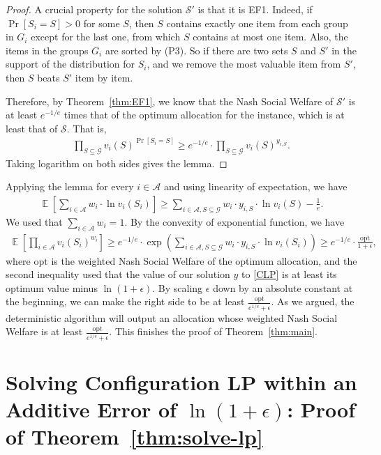 \documentclass[10pt,a4paper]{article}
\theoremstyle{definition}
\theoremstyle{plain}
\newcommand\calS{{\mathcal{S}}}
\newcommand\calA{{\mathcal{A}}}
\newcommand\calG{{\mathcal{G}}}
\DeclareMathOperator{\E}{\mathbb{E}}
\begin{document}
\begin{proof}
        A crucial property for the solution $\calS'$ is that it is EF1. Indeed, if $\Pr[S_i = S] > 0$ for some $S$, then $S$ contains exactly one item from each group in $G_i$ except for the last one, from which $S$ contains at most one item. Also, the items in the groups $G_i$ are sorted by (P3).  So if there are two sets $S$ and $S'$ in the support of the distribution for $S_i$, and we remove the most valuable item from $S'$, then $S$ beats $S'$ item by item. 
        
        Therefore, by Theorem~\ref{thm:EF1}, we know that the Nash Social Welfare of $\calS'$ is at least $e^{-1/e}$ times that of the optimum allocation for the instance, which is at least that of $\calS$. That is, 
        \begin{align*}
            \prod_{S \subseteq \calG} v_i(S)^{\Pr[S_i = S]} \geq e^{-1/e} \cdot \prod_{S \subseteq \calG} v_i(S)^{y_{i, S}}.
        \end{align*}
        Taking logarithm on both sides gives the lemma. 
    \end{proof}

    Applying the lemma for every $i \in \calA$ and using linearity of expectation, we have 
    \begin{align*}
        \E\left[\sum_{i \in \calA}w_i \cdot \ln v_i(S_i)\right] \geq \sum_{i \in \calA, S \subseteq \calG} w_i \cdot y_{i, S} \cdot \ln v_i(S) - \frac1e.
    \end{align*}
    We used that $\sum_{i \in \calA} w_i = 1$. 
    By the convexity of exponential function, we have 
    \begin{align*}
        \E\left[\prod_{i \in \calA}v_i(S_i)^{w_i}\right] \geq e^{-1/e} \cdot \exp\left(\sum_{i \in \calA, S \subseteq \calG} w_i \cdot y_{i, S} \cdot \ln v_i(S_i)\right) \geq e^{-1/e} \cdot \frac{\text{opt}}{1 + \epsilon},
    \end{align*}
    where $\text{opt}$ is the weighted Nash Social Welfare of the optimum allocation, and the second inequality used that the value of our solution $y$ to \eqref{CLP} is at least its optimum value minus $\ln(1+\epsilon)$.
    By scaling $\epsilon$ down by an absolute constant at the beginning, we can make the right side to be at least $\frac{\text{opt}}{e^{1/e} + \epsilon}$. As we argued, the deterministic algorithm will output an allocation whose weighted Nash Social Welfare is at least $\frac{\text{opt}}{e^{1/e} + \epsilon}$. This finishes the proof of Theorem~\ref{thm:main}.

    
\section{Solving Configuration LP within an Additive Error of \texorpdfstring{$\ln (1 + \epsilon)$}{log (1 + epsilon)}: Proof of Theorem~\ref{thm:solve-lp}} \label{sec:solving-LP}
\end{document}
